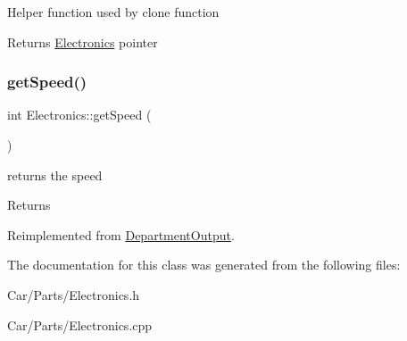 Helper function used by clone function \begin{DoxyReturn}{Returns}
\hyperlink{classElectronics}{Electronics} pointer 
\end{DoxyReturn}
\mbox{\label{classElectronics_a09912c940a0a8656d97f8597b766c0eb}} 
\subsubsection{\texorpdfstring{get\+Speed()}{getSpeed()}}
{\footnotesize\ttfamily int Electronics\+::get\+Speed (\begin{DoxyParamCaption}{ }\end{DoxyParamCaption})\hspace{0.3cm}{\ttfamily [virtual]}}

returns the speed \begin{DoxyReturn}{Returns}

\end{DoxyReturn}


Reimplemented from \hyperlink{classDepartmentOutput_a90caf8934a687d18b9855f19a421ecef}{Department\+Output}.



The documentation for this class was generated from the following files\+:\begin{DoxyCompactItemize}
\item 
Car/\+Parts/Electronics.\+h\item 
Car/\+Parts/Electronics.\+cpp\end{DoxyCompactItemize}
